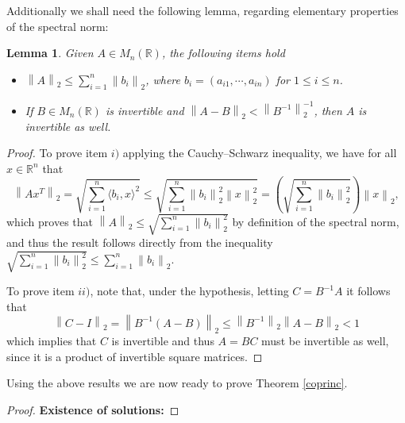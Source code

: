 \documentclass[10pt,a4paper,onecolumn]{article} %
\newtheorem{lemma}[theorem]{Lemma}
\newcommand{\R}{\mathbb{R}}
\begin{document}
\begin{appendix}
Additionally we shall need the following lemma, regarding elementary properties of the spectral norm:
\begin{lemma}\label{matrices} Given $A\in M_n(\R)$, the following items hold
\begin{itemize}
\item[i)] $ \left\|A\right\|_2 \leq \sum_{i=1}^n \left\|b_i\right\|_2$,
where $b_i = (a_{i1},\cdots,a_{in})$ for $1\leq i\leq n$.
\item[ii)] If $B\in M_n(\R)$ is invertible and
$\left\|A-B\right\|_2<\left\|B^{-1}\right\|_2^{-1}$,
then $A$ is invertible as well.
\end{itemize}
\end{lemma}
\begin{proof}To prove item $i)$ applying the Cauchy–Schwarz inequality, we have for all $x\in \R^n$ that
\begin{equation*}
\left\|Ax^T\right\|_2 = \sqrt{\sum_{i=1}^n \langle b_i, x\rangle^2} \leq \sqrt{\sum_{i=1}^n \left\|b_i\right\|_2^2 \left\|x\right\|_2^2}=\left(\sqrt{\sum_{i=1}^n \left\|b_i\right\|_2^2}\right)\left\|x\right\|_2,
\end{equation*}
which proves that $\left\|A\right\|_2\leq \sqrt{\sum_{i=1}^n \left\|b_i\right\|_2^2}$ by definition of the spectral norm, and thus the result follows directly from the inequality $\sqrt{\sum_{i=1}^n \left\|b_i\right\|_2^2}\leq \sum_{i=1}^n \left\|b_i\right\|_2$.

To prove item $ii)$, note that, under the hypothesis, letting $C=B^{-1}A$ it follows that
\begin{equation*}
\left\|C-I\right\|_2 = \left\|B^{-1}(A-B)\right\|_2\leq \left\|B^{-1}\right\|_2\left\|A-B\right\|_2 < 1
\end{equation*}
which implies that $C$ is invertible and thus $A=BC$ must be invertible as well, since it is a product of invertible square matrices.
\end{proof}



\noindent Using the above results we are now ready to prove Theorem \ref{coprinc}.

\begin{proof} 

\noindent \textbf{ Existence of solutions:}
\vspace{0.3cm}


\end{proof}
\end{appendix}
\end{document}
